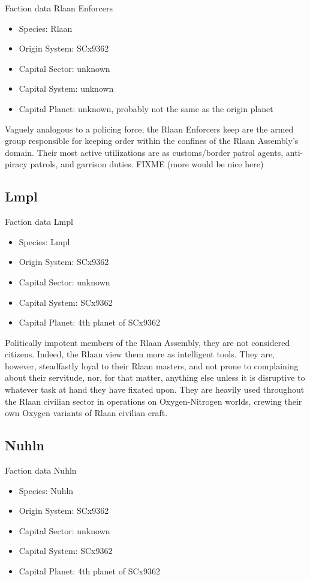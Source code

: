 Faction data Rlaan Enforcers
\begin{itemize}
\item Species: Rlaan
\item Origin System: SCx9362
\item Capital Sector: unknown
\item Capital System: unknown
\item Capital Planet: unknown, probably not the same as the origin planet
\end{itemize}

Vaguely analogous to a policing force, the Rlaan Enforcers keep are
the armed group responsible for keeping order within the confines of
the Rlaan Assembly's domain. Their most active utilizations are as
customs/border patrol agents, anti-piracy patrols, and garrison
duties.  FIXME (more would be nice here)
 
\subsection{Lmpl}

Faction data Lmpl
\begin{itemize}
\item Species: Lmpl
\item Origin System: SCx9362
\item Capital Sector: unknown
\item Capital System: SCx9362
\item Capital Planet: 4th planet of SCx9362
\end{itemize}

Politically impotent members of the Rlaan Assembly, they are not
considered citizens. Indeed, the Rlaan view them more as intelligent
tools. They are, however, steadfastly loyal to their Rlaan masters,
and not prone to complaining about their servitude, nor, for that
matter, anything else unless it is disruptive to whatever task at hand
they have fixated upon. They are heavily used throughout the Rlaan
civilian sector in operations on Oxygen-Nitrogen worlds, crewing their
own Oxygen variants of Rlaan civilian craft.
 
\subsection{Nuhln}

Faction data Nuhln
\begin{itemize}
\item Species: Nuhln
\item Origin System: SCx9362
\item Capital Sector: unknown
\item Capital System: SCx9362
\item Capital Planet: 4th planet of SCx9362
\end{itemize}

